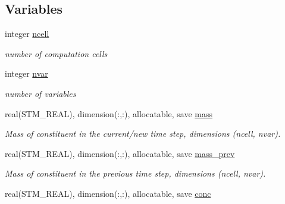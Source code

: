 \subsection*{Variables}
\begin{CompactItemize}
\item 
\hypertarget{a00037_d30ffe89b9bf19b7ebd4959610c0668e}{
integer \hyperlink{a00037_d30ffe89b9bf19b7ebd4959610c0668e}{ncell}}
\label{a00037_d30ffe89b9bf19b7ebd4959610c0668e}

\begin{CompactList}\small\item\em number of computation cells \item\end{CompactList}\item 
\hypertarget{a00037_85a0e44203c92854cc05d8525ad1d214}{
integer \hyperlink{a00037_85a0e44203c92854cc05d8525ad1d214}{nvar}}
\label{a00037_85a0e44203c92854cc05d8525ad1d214}

\begin{CompactList}\small\item\em number of variables \item\end{CompactList}\item 
\hypertarget{a00037_d3cd77f108b625136b827b9c73a35d55}{
real(STM\_\-REAL), dimension(:,:), allocatable, save \hyperlink{a00037_d3cd77f108b625136b827b9c73a35d55}{mass}}
\label{a00037_d3cd77f108b625136b827b9c73a35d55}

\begin{CompactList}\small\item\em Mass of constituent in the current/new time step, dimensions (ncell, nvar). \item\end{CompactList}\item 
\hypertarget{a00037_42706f8217e846d142ae1a49a442fa95}{
real(STM\_\-REAL), dimension(:,:), allocatable, save \hyperlink{a00037_42706f8217e846d142ae1a49a442fa95}{mass\_\-prev}}
\label{a00037_42706f8217e846d142ae1a49a442fa95}

\begin{CompactList}\small\item\em Mass of constituent in the previous time step, dimensions (ncell, nvar). \item\end{CompactList}\item 
\hypertarget{a00037_cecdc1ee4b6b06dd5478cedc26d8afae}{
real(STM\_\-REAL), dimension(:,:), allocatable, save \hyperlink{a00037_cecdc1ee4b6b06dd5478cedc26d8afae}{conc}}
\label{a00037_cecdc1ee4b6b06dd5478cedc26d8afae}


\end{CompactItemize}
